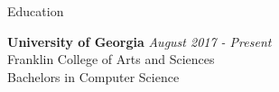 \documentclass{resume} %
\begin{document}

\begin{rSection}{Education}

{\bf University of Georgia} \hfill {\em August 2017 - Present}
\\ Franklin College of Arts and Sciences
\\ Bachelors in Computer Science

\end{rSection}

\end{document}
